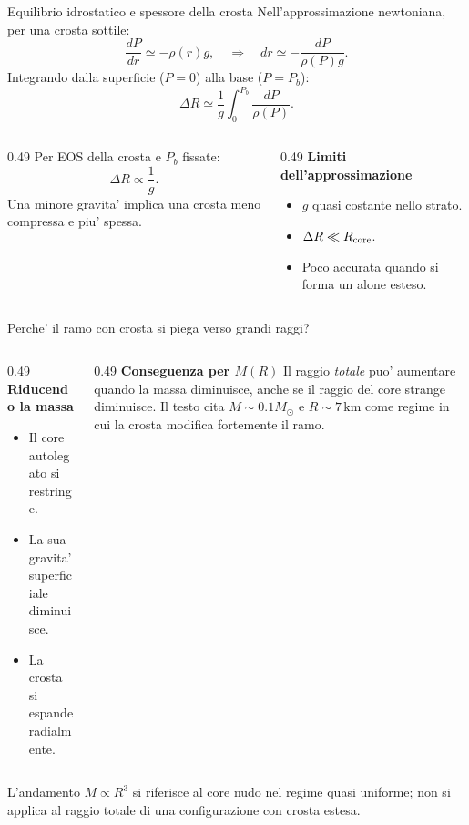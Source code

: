\begin{frame}{Equilibrio idrostatico e spessore della crosta}
\small
Nell'approssimazione newtoniana, per una crosta sottile:
\[
\frac{dP}{dr}\simeq-\rho(r)g,
\quad\Longrightarrow\quad
 dr\simeq-\frac{dP}{\rho(P)g}.
\]
Integrando dalla superficie ($P=0$) alla base ($P=P_b$):
\[
\Delta R\simeq\frac1g\int_0^{P_b}\frac{dP}{\rho(P)}.
\]
\begin{columns}[T,onlytextwidth]
\begin{column}{0.49\textwidth}
Per EOS della crosta e $P_b$ fissate:
\[
\Delta R\propto\frac1g.
\]
Una minore gravita' implica una crosta meno compressa e piu' spessa.
\end{column}
\begin{column}{0.49\textwidth}
\textbf{Limiti dell'approssimazione}
\begin{itemize}
\item $g$ quasi costante nello strato.
\item $\Delta R\ll R_{\rm core}$.
\item Poco accurata quando si forma un alone esteso.
\end{itemize}
\end{column}
\end{columns}
\end{frame}

\begin{frame}{Perche' il ramo con crosta si piega verso grandi raggi?}
\small
\begin{columns}[T,onlytextwidth]
\begin{column}{0.49\textwidth}
\textbf{Riducendo la massa}
\begin{itemize}
\item Il core autolegato si restringe.
\item La sua gravita' superficiale diminuisce.
\item La crosta si espande radialmente.
\end{itemize}
\end{column}
\begin{column}{0.49\textwidth}
\textbf{Conseguenza per $M(R)$}
Il raggio \emph{totale} puo' aumentare quando la massa diminuisce, anche se il raggio del core strange diminuisce.
\medskip
Il testo cita $M\sim0.1M_\odot$ e $R\sim7\,\mathrm{km}$ come regime in cui la crosta modifica fortemente il ramo.
\end{column}
\end{columns}
\medskip
L'andamento $M\propto R^3$ si riferisce al core nudo nel regime quasi uniforme; non si applica al raggio totale di una configurazione con crosta estesa.
\end{frame}

